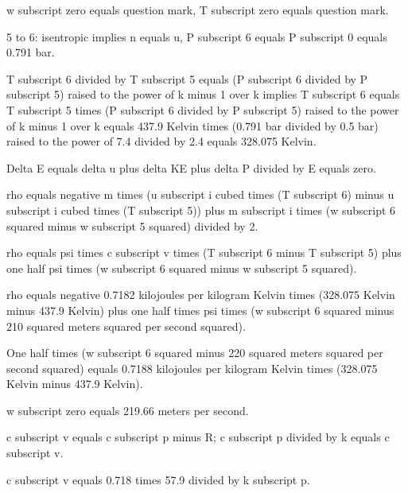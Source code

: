 w subscript zero equals question mark, T subscript zero equals question mark.

5 to 6: isentropic implies n equals u, P subscript 6 equals P subscript 0 equals 0.791 bar.

T subscript 6 divided by T subscript 5 equals (P subscript 6 divided by P subscript 5) raised to the power of k minus 1 over k implies T subscript 6 equals T subscript 5 times (P subscript 6 divided by P subscript 5) raised to the power of k minus 1 over k equals 437.9 Kelvin times (0.791 bar divided by 0.5 bar) raised to the power of 7.4 divided by 2.4 equals 328.075 Kelvin.

Delta E equals delta u plus delta KE plus delta P divided by E equals zero.

rho equals negative m times (u subscript i cubed times (T subscript 6) minus u subscript i cubed times (T subscript 5)) plus m subscript i times (w subscript 6 squared minus w subscript 5 squared) divided by 2.

rho equals psi times c subscript v times (T subscript 6 minus T subscript 5) plus one half psi times (w subscript 6 squared minus w subscript 5 squared).

rho equals negative 0.7182 kilojoules per kilogram Kelvin times (328.075 Kelvin minus 437.9 Kelvin) plus one half times psi times (w subscript 6 squared minus 210 squared meters squared per second squared).

One half times (w subscript 6 squared minus 220 squared meters squared per second squared) equals 0.7188 kilojoules per kilogram Kelvin times (328.075 Kelvin minus 437.9 Kelvin).

w subscript zero equals 219.66 meters per second.

c subscript v equals c subscript p minus R; c subscript p divided by k equals c subscript v.

c subscript v equals 0.718 times 57.9 divided by k subscript p.